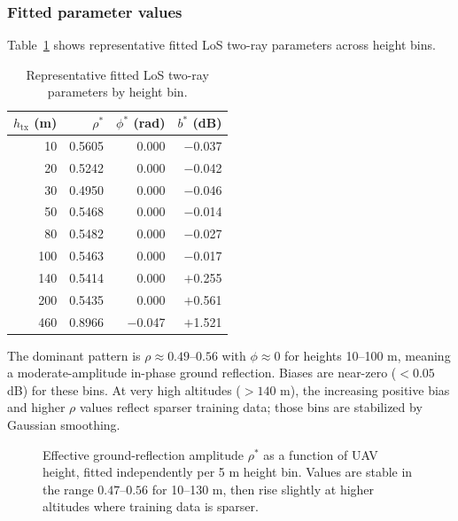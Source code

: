 \documentclass[11pt,a4paper]{article}
\begin{document}
\subsubsection{Fitted parameter values}

Table~\ref{tab:los_params} shows representative fitted LoS two-ray parameters
across height bins.

\begin{table}[H]
\centering
\caption{Representative fitted LoS two-ray parameters by height bin.}
\label{tab:los_params}
\small
\begin{tabular}{rrrr}
\toprule
$h_{\mathrm{tx}}$ (m) & $\rho^*$ & $\phi^*$ (rad) & $b^*$ (dB)\\
\midrule
10  & 0.5605 & 0.000 & $-$0.037 \\
20  & 0.5242 & 0.000 & $-$0.042 \\
30  & 0.4950 & 0.000 & $-$0.046 \\
50  & 0.5468 & 0.000 & $-$0.014 \\
80  & 0.5482 & 0.000 & $-$0.027 \\
100 & 0.5463 & 0.000 & $-$0.017 \\
140 & 0.5414 & 0.000 & $+$0.255 \\
200 & 0.5435 & 0.000 & $+$0.561 \\
460 & 0.8966 & $-$0.047 & $+$1.521 \\
\bottomrule
\end{tabular}
\end{table}

The dominant pattern is $\rho \approx 0.49$--$0.56$ with $\phi \approx 0$
for heights 10--100 m, meaning a moderate-amplitude in-phase ground
reflection. Biases are near-zero ($< 0.05$ dB) for these bins. At very high
altitudes ($>140$ m), the increasing positive bias and higher $\rho$ values
reflect sparser training data; those bins are stabilized by Gaussian
smoothing.

\begin{figure}[H]
\centering
{}
\caption{Effective ground-reflection amplitude $\rho^*$ as a function of UAV
height, fitted independently per 5 m height bin. Values are stable in the
range $0.47$--$0.56$ for 10--130 m, then rise slightly at higher altitudes
where training data is sparser.}
\label{fig:rho_vs_h}
\end{figure}
\end{document}
